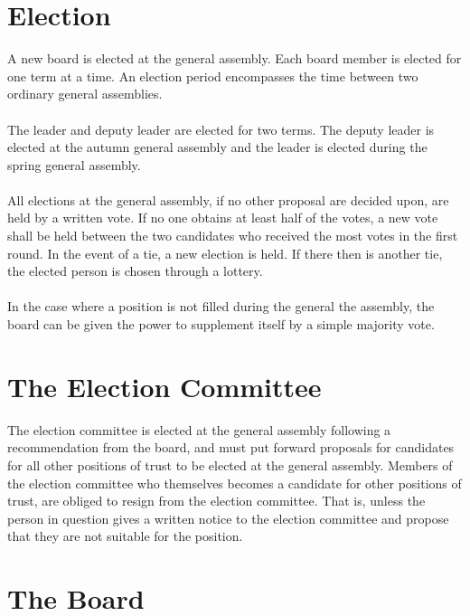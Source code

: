 \documentclass[12pt,a4paper,norsk]{article}
\begin{document}
\section{Election}

A new board is elected at the general assembly. Each board member is elected for one term at a time.
An election period encompasses the time between two ordinary general assemblies.
\\
\\
The leader and deputy leader are elected for two terms. The deputy leader is elected at the autumn general assembly and the leader is elected during the spring general assembly.
\\
\\
All elections at the general assembly, if no other proposal are decided upon, are held by a written vote. If no one obtains at least half of the votes, a new vote shall be held between the two candidates who received the most votes in the first round. In the event of a tie, a new election is held. If there then is another tie, the elected person is chosen through a lottery.
\\
\\
In the case where a position is not filled during the general the assembly, the board can be given the power to supplement itself by a simple majority vote.



\section{The Election Committee}

The election committee is elected at the general assembly following a recommendation from the board, and must
put forward proposals for candidates for all other positions of trust to be elected
at the general assembly. Members of the election committee who themselves becomes a candidate for other positions of trust,
are obliged to resign from the election committee. That is, unless the person in question gives a written notice
to the election committee and propose that they are not suitable for the position.


\section{The Board}
\end{document}
